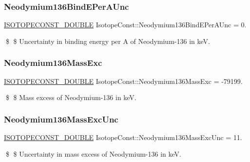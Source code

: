 \subsubsection{\texorpdfstring{Neodymium136\+Bind\+E\+Per\+A\+Unc}{Neodymium136BindEPerAUnc}}
{\footnotesize\ttfamily \mbox{\hyperlink{group___isotope_const-_macros_ga8f45a7272ce02c0b4c65c44636ed719a}{I\+S\+O\+T\+O\+P\+E\+C\+O\+N\+S\+T\+\_\+\+D\+O\+U\+B\+LE}} Isotope\+Const\+::\+Neodymium136\+Bind\+E\+Per\+A\+Unc = 0.}

\$ \$ Uncertainty in binding energy per A of Neodymium-\/136 in keV. \mbox{\label{group___isotope_const-_neodymium-_nd136_gaf16fbad8663818fea0d30bf981cc4713}} 
\subsubsection{\texorpdfstring{Neodymium136\+Mass\+Exc}{Neodymium136MassExc}}
{\footnotesize\ttfamily \mbox{\hyperlink{group___isotope_const-_macros_ga8f45a7272ce02c0b4c65c44636ed719a}{I\+S\+O\+T\+O\+P\+E\+C\+O\+N\+S\+T\+\_\+\+D\+O\+U\+B\+LE}} Isotope\+Const\+::\+Neodymium136\+Mass\+Exc = -\/79199.}

\$ \$ Mass excess of Neodymium-\/136 in keV. \mbox{\label{group___isotope_const-_neodymium-_nd136_ga53efbf392f6378a031e6331f5518c862}} 
\subsubsection{\texorpdfstring{Neodymium136\+Mass\+Exc\+Unc}{Neodymium136MassExcUnc}}
{\footnotesize\ttfamily \mbox{\hyperlink{group___isotope_const-_macros_ga8f45a7272ce02c0b4c65c44636ed719a}{I\+S\+O\+T\+O\+P\+E\+C\+O\+N\+S\+T\+\_\+\+D\+O\+U\+B\+LE}} Isotope\+Const\+::\+Neodymium136\+Mass\+Exc\+Unc = 11.}

\$ \$ Uncertainty in mass excess of Neodymium-\/136 in keV. \mbox{\label{group___isotope_const-_neodymium-_nd136_ga895ad931948d568a7f33fa6a243c866d}} 
